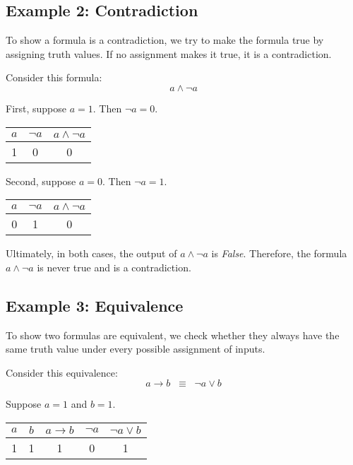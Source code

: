 \documentclass[12pt,a4paper,openany]{article}
\begin{document}
\subsection{Example 2: Contradiction}

To show a formula is a contradiction, we try to make the formula true by assigning truth values. If no assignment makes it true, it is a contradiction.

Consider this formula:
$$ a \land \neg a $$

First, suppose $a = 1$. Then $\neg a = 0$.

\begin{center}
\begin{tabular}{|c|c|c|}
\hline
$a$ & $\neg a$ & $a \land \neg a$ \\
\hline
\textcolor{truecolor}{1} & \textcolor{falsecolor}{0} & \textcolor{falsecolor}{0} \\
\hline
\end{tabular}
\end{center}

Second, suppose $a = 0$. Then $\neg a = 1$.

\begin{center}
\begin{tabular}{|c|c|c|}
\hline
$a$ & $\neg a$ & $a \land \neg a$ \\
\hline
\textcolor{falsecolor}{0} & \textcolor{truecolor}{1} & \textcolor{falsecolor}{0} \\
\hline
\end{tabular}
\end{center}

Ultimately, in both cases, the output of $a \land \neg a$ is \textit{False}. Therefore, the formula $a \land \neg a$ is never true and is a contradiction.

\subsection{Example 3: Equivalence}

To show two formulas are equivalent, we check whether they always have the same truth value under every possible assignment of inputs.

Consider this equivalence:
$$ a \to b \;\;\equiv\;\; \neg a \lor b $$

Suppose $a = 1$ and $b = 1$.

\begin{center}
\begin{tabular}{|c|c|c|c|c|}
\hline
$a$ & $b$ & $a \to b$ & $\neg a$ & $\neg a \lor b$ \\
\hline
\textcolor{truecolor}{1} & \textcolor{truecolor}{1} & \textcolor{truecolor}{1} & \textcolor{falsecolor}{0} & \textcolor{truecolor}{1} \\
\hline
\end{tabular}
\end{center}
\end{document}
